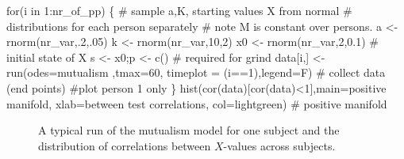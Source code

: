 \documentclass[
  a4paper,
  DIV=11,
  numbers=noendperiod,
  oneside]{scrreprt}
\newenvironment{Shaded}{}{}
\newcommand{\AttributeTok}[1]{\textcolor[rgb]{0.84,0.23,0.29}{#1}}
\newcommand{\CommentTok}[1]{\textcolor[rgb]{0.42,0.45,0.49}{#1}}
\newcommand{\ControlFlowTok}[1]{\textcolor[rgb]{0.84,0.23,0.29}{#1}}
\newcommand{\DecValTok}[1]{\textcolor[rgb]{0.00,0.36,0.77}{#1}}
\newcommand{\FloatTok}[1]{\textcolor[rgb]{0.00,0.36,0.77}{#1}}
\newcommand{\FunctionTok}[1]{\textcolor[rgb]{0.44,0.26,0.76}{#1}}
\newcommand{\NormalTok}[1]{\textcolor[rgb]{0.14,0.16,0.18}{#1}}
\newcommand{\OtherTok}[1]{\textcolor[rgb]{0.44,0.26,0.76}{#1}}
\newcommand{\SpecialCharTok}[1]{\textcolor[rgb]{0.00,0.36,0.77}{#1}}
\newcommand{\StringTok}[1]{\textcolor[rgb]{0.01,0.18,0.38}{#1}}
\begin{document}
\begin{Shaded}
\begin{Highlighting}[]
\ControlFlowTok{for}\NormalTok{(i }\ControlFlowTok{in} \DecValTok{1}\SpecialCharTok{:}\NormalTok{nr\_of\_pp)}
\NormalTok{\{}
  \CommentTok{\# sample a,K, starting values X from normal }
  \CommentTok{\# distributions for each person separately}
  \CommentTok{\# note M is constant over persons.}
\NormalTok{  a }\OtherTok{\textless{}{-}} \FunctionTok{rnorm}\NormalTok{(nr\_var,.}\DecValTok{2}\NormalTok{,.}\DecValTok{05}\NormalTok{) }
\NormalTok{  k }\OtherTok{\textless{}{-}} \FunctionTok{rnorm}\NormalTok{(nr\_var,}\DecValTok{10}\NormalTok{,}\DecValTok{2}\NormalTok{)}
\NormalTok{  x0 }\OtherTok{\textless{}{-}} \FunctionTok{rnorm}\NormalTok{(nr\_var,}\DecValTok{2}\NormalTok{,}\FloatTok{0.1}\NormalTok{) }\CommentTok{\# initial state of X}
\NormalTok{  s  }\OtherTok{\textless{}{-}}\NormalTok{ x0;p }\OtherTok{\textless{}{-}} \FunctionTok{c}\NormalTok{() }\CommentTok{\# required for grind}
\NormalTok{  data[i,] }\OtherTok{\textless{}{-}} \FunctionTok{run}\NormalTok{(}\AttributeTok{odes=}\NormalTok{mutualism ,}\AttributeTok{tmax=}\DecValTok{60}\NormalTok{, }
      \AttributeTok{timeplot =}\NormalTok{ (i}\SpecialCharTok{==}\DecValTok{1}\NormalTok{),}\AttributeTok{legend=}\NormalTok{F) }\CommentTok{\# collect data (end points)}
  \CommentTok{\#plot person 1 only}
\NormalTok{\}}
\FunctionTok{hist}\NormalTok{(}\FunctionTok{cor}\NormalTok{(data)[}\FunctionTok{cor}\NormalTok{(data)}\SpecialCharTok{\textless{}}\DecValTok{1}\NormalTok{],}\AttributeTok{main=}\StringTok{\textquotesingle{}positive manifold\textquotesingle{}}\NormalTok{,}
     \AttributeTok{xlab=}\StringTok{\textquotesingle{}between test correlations\textquotesingle{}}\NormalTok{,}
     \AttributeTok{col=}\StringTok{\textquotesingle{}lightgreen\textquotesingle{}}\NormalTok{) }\CommentTok{\# positive manifold}
\end{Highlighting}
\end{Shaded}

\begin{figure}


\caption{\label{fig-ch6-img7-old-76}A typical run of the mutualism model
for one subject and the distribution of correlations between
\(X\)-values across subjects.}

\end{figure}%
\end{document}

